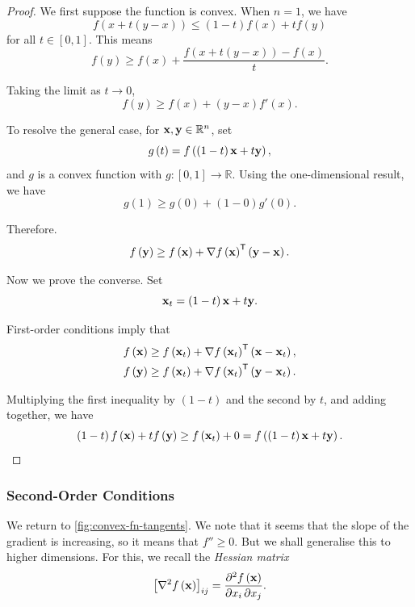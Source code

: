 \documentclass[11pt]{article}
\theoremstyle{definition}
\theoremstyle{remark}
\newcommand{\pqty}[1]{\left(#1\right)}
\newcommand{\bqty}[1]{\left[#1\right]}
\newcommand{\ccintv}[2]{[#1,#2]}
\newcommand{\functiondomain}[3]{#1:#2\to #3}
\newcommand{\RR}{\mathbb{R}}
\newcommand{\transpose}{^{\mathsf{T}}}
\newcommand{\grad}{\nabla}
\newcommand{\pdv}[3]{\frac{\partial^2 #1}{\partial #2\,\partial #3}}
\begin{document}
\begin{proof}
    We first suppose the function is convex. When \(n = 1\), we have
    \[
        f\pqty{x + t \pqty{y - x}} \leq \pqty{1 - t} f\pqty{x} + t f\pqty{y}
    \]
    for all \(t \in \ccintv{0}{1}\). This means
    \[
        f\pqty{y} \geq f\pqty{x} + \frac{f\pqty{x + t \pqty{y - x}} - f\pqty{x}}{t}.
    \]

    Taking the limit as \(t \to 0\),
    \[
        f\pqty{y} \geq f\pqty{x} + \pqty{y - x} f'\pqty{x}.
    \]

    To resolve the general case, for \(\vb{x}, \vb{y} \in \RR^n\), set
    \[
        g\pqty{t} = f\pqty{\pqty{1 - t} \vb{x} + t \vb{y}},
    \]  
    and \(g\) is a convex function with \(\functiondomain{g}{\ccintv{0}{1}}{\RR}\). Using the one-dimensional result, we have
    \[
        g\pqty{1} \geq g\pqty{0} + \pqty{1 - 0} g'\pqty{0}.
    \]

    Therefore.
    \[
        f\pqty{\vb{y}} \geq f\pqty{\vb{x}} + \grad f\pqty{\vb{x}} \transpose \pqty{\vb{y} - \vb{x}}.
    \]

    Now we prove the converse. Set
    \[
        \vb{x}_t = \pqty{1 - t} \vb{x} + t\vb{y}.
    \]

    First-order conditions imply that
    \begin{align*}
        f\pqty{\vb{x}} &\geq f\pqty{\vb{x}_t} + \grad f\pqty{\vb{x}_t} \transpose \pqty{\vb{x} - \vb{x}_t}, \\
        f\pqty{\vb{y}} &\geq f\pqty{\vb{x}_t} + \grad f\pqty{\vb{x}_t} \transpose \pqty{\vb{y} - \vb{x}_t}.
    \end{align*}

    Multiplying the first inequality by \(\pqty{1 - t}\) and the second by \(t\), and adding together, we have
    \[
        \pqty{1 - t} f\pqty{\vb{x}} + t f\pqty{\vb{y}} \geq f\pqty{\vb{x}_t} + 0 = f\pqty{\pqty{1 - t} \vb{x} + t \vb{y}}.
    \]
\end{proof}

\subsubsection{Second-Order Conditions}

We return to \autoref{fig:convex-fn-tangents}. We note that it seems that the slope of the gradient is increasing, so it means that \(f'' \geq 0\). But we shall generalise this to higher dimensions. For this, we recall the \emph{Hessian matrix}
\[
    \bqty{\grad^2 f\pqty{\vb{x}}}_{ij} = \pdv{f\pqty{\vb{x}}}{x_i}{x_j}.
\]
\end{document}
